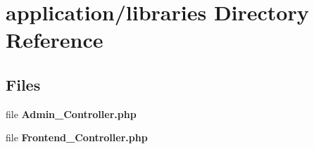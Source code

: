 \section{application/libraries Directory Reference}
\label{dir_c728ed93dccbeaf53c1fa7ba8b634998}
\subsection*{Files}
\begin{DoxyCompactItemize}
\item 
file {\bf Admin\-\_\-\-Controller.\-php}
\item 
file {\bf Frontend\-\_\-\-Controller.\-php}
\end{DoxyCompactItemize}
